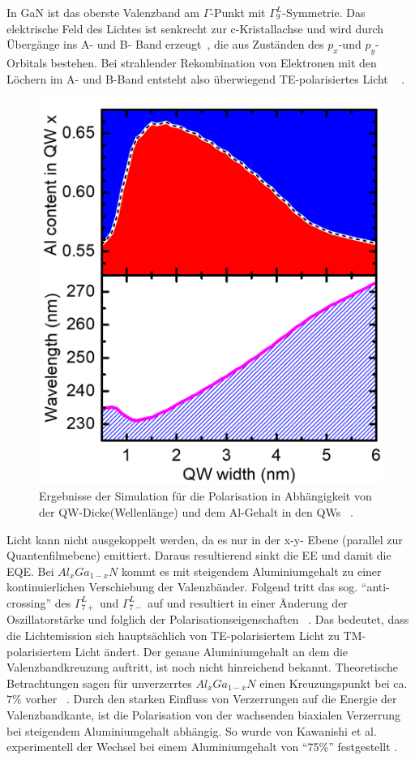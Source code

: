 \noindent
\newline
In GaN ist das oberste Valenzband am $\Gamma$-Punkt mit $\Gamma^{L}_{9}$-Symmetrie. Das elektrische Feld des Lichtes ist senkrecht zur c-Kristallachse und wird durch Übergänge ins A- und B- Band erzeugt~\cite{doi:10.1063/1.3574025}, die aus Zuständen des $p_x$-und $p_y$-Orbitals bestehen. Bei strahlender Rekombination von Elektronen mit den Löchern im A- und B-Band entsteht also überwiegend TE-polarisiertes Licht ~\cite{doi:10.1063/1.3574025} . 
%
\begin{figure}[ht!]
  \centering
  \begin{minipage}{\linewidth}
      \centering
      \includegraphics[width=0.6\linewidth]{Bilder/christophPolarisationSimu1.png}
      \caption{Ergebnisse der Simulation für die Polarisation in Abhängigkeit von der QW-Dicke(Wellenlänge) und dem Al-Gehalt in den QWs ~\cite{doi:10.1063/1.4932651}.}
      \label{fig:simu1chr}
  \end{minipage}
\end{figure}
%
Licht kann nicht ausgekoppelt werden, da es nur in der x-y- Ebene (parallel zur Quantenfilmebene) emittiert. Daraus resultierend sinkt die EE und damit die EQE. Bei $Al_{x}Ga_{1-x}N$ kommt es mit steigendem Aluminiumgehalt zu einer kontinuierlichen Verschiebung der Valenzbänder. Folgend tritt das sog. "`anti-crossing"' des $\Gamma^{L}_{7+}$ und $\Gamma^{L}_{7-}$ auf und resultiert in einer Änderung der Oszillatorstärke und folglich der Polarisationseigenschaften ~\cite{doi:10.1063/1.4932651}.
\newline
Das bedeutet, dass die Lichtemission sich hauptsächlich von TE-polarisiertem Licht zu TM-polarisiertem Licht ändert. Der genaue Aluminiumgehalt an dem die Valenzbandkreuzung auftritt, ist noch nicht hinreichend bekannt. Theoretische Betrachtungen sagen für unverzerrtes $Al_{x}Ga_{1-x}N$ einen Kreuzungspunkt bei ca. $7\%$ vorher ~\cite{doi:10.1063/1.3675451}. Durch den starken Einfluss von Verzerrungen auf die Energie der  Valenzbandkante, ist die Polarisation von der wachsenden biaxialen Verzerrung bei steigendem Aluminiumgehalt abhängig. So wurde von Kawanishi et al. experimentell der Wechsel bei einem Aluminiumgehalt von "`75\%"' festgestellt \cite{doi:10.1063/1.2410242}. 
